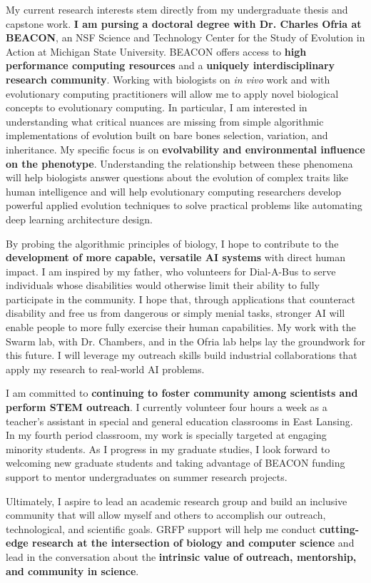\noindent
\underline{}
My current research interests stem directly from my undergraduate thesis and capstone work.
\textbf{I am pursing a doctoral degree with Dr. Charles Ofria at BEACON}, an NSF Science and Technology Center for the Study of Evolution in Action at Michigan State University.
BEACON offers access to \textbf{high performance computing resources} and a \textbf{uniquely interdisciplinary research community}.
Working with biologists on \textit{in vivo} work and with evolutionary computing practitioners will allow me to apply novel biological concepts to evolutionary computing.
In particular, I am interested in understanding what critical nuances are missing from simple algorithmic implementations of evolution built on bare bones selection, variation, and inheritance.
My specific focus is on \textbf{evolvability and environmental influence on the phenotype}.
Understanding the relationship between these phenomena will help biologists answer questions about the evolution of complex traits like human intelligence and will help evolutionary computing researchers develop powerful applied evolution techniques to solve practical problems like automating deep learning architecture design.

By probing the algorithmic principles of biology, I hope to contribute to the \textbf{development of more capable, versatile AI systems} with direct human impact.
I am inspired by my father, who volunteers for Dial-A-Bus to serve individuals whose disabilities would otherwise limit their ability to fully participate in the community.
I hope that, through applications that counteract disability and free us from dangerous or simply menial tasks, stronger AI will enable people to more fully exercise their human capabilities.
My work with the Swarm lab, with Dr. Chambers, and in the Ofria lab helps lay the groundwork for this future.
I will leverage my outreach skills build industrial collaborations that apply my research to real-world AI problems.

I am committed to \textbf{continuing to foster community among scientists and perform STEM outreach}.
I currently volunteer four hours a week as a teacher's assistant in special and general education classrooms in East Lansing.
In my fourth period classroom, my work is specially targeted at engaging minority students.
As I progress in my graduate studies, I look forward to welcoming new graduate students and taking advantage of BEACON funding support to mentor undergraduates on summer research projects.

Ultimately, I aspire to lead an academic research group and build an inclusive community that will allow myself and others to accomplish our outreach, technological, and scientific goals.
GRFP support will help me conduct \textbf{cutting-edge research at the intersection of biology and computer science} and lead in the conversation about the \textbf{intrinsic value of outreach, mentorship, and community in science}.
